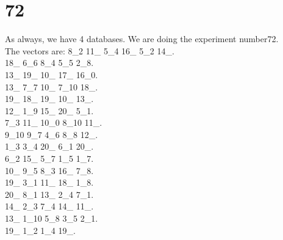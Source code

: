 \chapter{72}
\indent As always, we have 4 databases. We are doing the experiment number72.\\
The vectors are:
8\_2 11\_ 5\_4 16\_ 5\_2 14\_.\\18\_ 6\_6 8\_4 5\_5 2\_8.\\13\_ 19\_ 10\_ 17\_ 16\_0.\\13\_ 7\_7 10\_ 7\_10 18\_.\\19\_ 18\_ 19\_ 10\_ 13\_.\\12\_ 1\_9 15\_ 20\_ 5\_1.\\7\_3 11\_ 10\_0 8\_10 11\_.\\9\_10 9\_7 4\_6 8\_8 12\_.\\1\_3 3\_4 20\_ 6\_1 20\_.\\6\_2 15\_ 5\_7 1\_5 1\_7.\\10\_ 9\_5 8\_3 16\_ 7\_8.\\19\_ 3\_1 11\_ 18\_ 1\_8.\\20\_ 8\_1 13\_ 2\_4 7\_1.\\14\_ 2\_3 7\_4 14\_ 11\_.\\13\_ 1\_10 5\_8 3\_5 2\_1.\\19\_ 1\_2 1\_4 19\_.\\